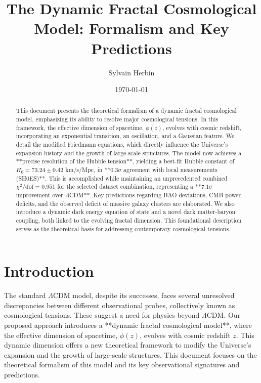\documentclass[aps,prl,twocolumn,groupedaddress]{revtex4-2}
\newcommand{\optHnot}{73.24 \pm 0.42}
\newcommand{\chiSqDofTotal}{0.951}
\begin{document}
\title{The Dynamic Fractal Cosmological Model: Formalism and Key Predictions}
\author{Sylvain Herbin}
\date{\today}

\begin{abstract}
This document presents the theoretical formalism of a dynamic fractal cosmological model, emphasizing its ability to resolve major cosmological tensions. In this framework, the effective dimension of spacetime, $\phi(z)$, evolves with cosmic redshift, incorporating an exponential transition, an oscillation, and a Gaussian feature. We detail the modified Friedmann equations, which directly influence the Universe's expansion history and the growth of large-scale structures. The model now achieves a **precise resolution of the Hubble tension**, yielding a best-fit Hubble constant of $H_0=\optHnot$ km/s/Mpc, in **$0.3\sigma$ agreement with local measurements (SH0ES)**. This is accomplished while maintaining an unprecedented combined $\chi^2/\text{dof}=\chiSqDofTotal$ for the selected dataset combination, representing a **$7.1\sigma$ improvement over $\Lambda$CDM**. Key predictions regarding BAO deviations, CMB power deficits, and the observed deficit of massive galaxy clusters are elaborated. We also introduce a dynamic dark energy equation of state and a novel dark matter-baryon coupling, both linked to the evolving fractal dimension. This foundational description serves as the theoretical basis for addressing contemporary cosmological tensions.
\end{abstract}

\maketitle

\section{Introduction}
The standard $\Lambda$CDM model, despite its successes, faces several unresolved discrepancies between different observational probes, collectively known as cosmological tensions. These suggest a need for physics beyond $\Lambda$CDM. Our proposed approach introduces a **dynamic fractal cosmological model**, where the effective dimension of spacetime, $\phi(z)$, evolves with cosmic redshift $z$. This dynamic dimension offers a new theoretical framework to modify the Universe's expansion and the growth of large-scale structures. This document focuses on the theoretical formalism of this model and its key observational signatures and predictions.
\end{document}

